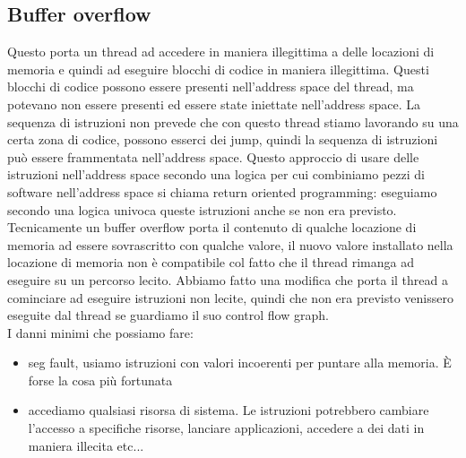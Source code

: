 \documentclass[12pt, oneside]{extbook}
\begin{document}
\subsection{Buffer overflow}
Questo porta un thread ad accedere in maniera illegittima a delle locazioni di memoria e quindi ad eseguire blocchi di codice in maniera illegittima. Questi blocchi di codice possono essere presenti nell'address space del thread, ma potevano non essere presenti ed essere state iniettate nell'address space. La sequenza di istruzioni non prevede che con questo thread stiamo lavorando su una certa zona di codice, possono esserci dei jump, quindi la sequenza di istruzioni può essere frammentata nell'address space. Questo approccio di usare delle istruzioni nell'address space secondo una logica per cui combiniamo pezzi di software nell'address space si chiama return oriented programming: eseguiamo secondo una logica univoca queste istruzioni anche se non era previsto.\\Tecnicamente un buffer overflow porta il contenuto di qualche locazione di memoria ad essere sovrascritto con qualche valore, il nuovo valore installato nella locazione di memoria non è compatibile col fatto che il thread rimanga ad eseguire su un percorso lecito. Abbiamo fatto una modifica che porta il thread a cominciare ad eseguire istruzioni non lecite, quindi che non era previsto venissero eseguite dal thread se guardiamo il suo control flow graph.\\I danni minimi che possiamo fare:
\begin{itemize}
	\item seg fault, usiamo istruzioni con valori incoerenti per puntare alla memoria. È forse la cosa più fortunata
	\item accediamo qualsiasi risorsa di sistema. Le istruzioni potrebbero cambiare l'accesso a specifiche risorse, lanciare applicazioni, accedere a dei dati in maniera illecita etc...
\end{itemize}
\end{document}
